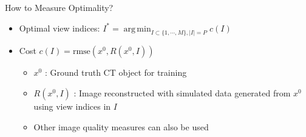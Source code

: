 \documentclass[english,aspectratio=169]{beamer}
\DeclareMathOperator*{\argmin}{arg\,min}
\begin{document}
\begin{frame}{How to Measure Optimality?}
	\begin{itemize}
	    \setlength\itemsep{2em}
		\item Optimal view indices: $I^* = \argmin_{I \subset \{ 1, \cdots, M \}, |I|=P} c(I)  $
		
		\item Cost $c(I) = \text{rmse}(x^0, R(x^0,I))$ 
		\begin{itemize}
		    \item $x^0$ : Ground truth CT object for training
		    \item $R(x^0,I)$ : Image reconstructed with simulated data generated from $x^0$ using view indices in $I$
		    \item Other image quality measures can also be used
		
	    \end{itemize}
		
		
	\end{itemize}
\end{frame}
\end{document}
